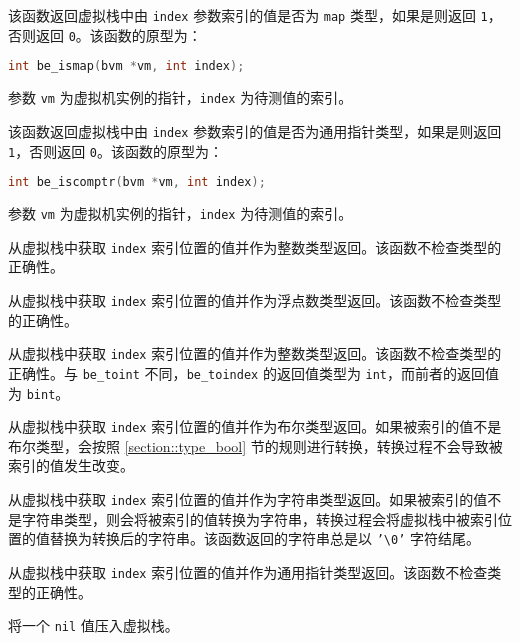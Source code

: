 
该函数返回虚拟栈中由 \texttt{index} 参数索引的值是否为 \texttt{map} 类型，如果是则返回 \texttt{1}，否则返回 \texttt{0}。该函数的原型为：
\begin{lstlisting}[language=c, style=berry, numbers=none]
int be_ismap(bvm *vm, int index);
\end{lstlisting}
参数 \texttt{vm} 为虚拟机实例的指针，\texttt{index} 为待测值的索引。


该函数返回虚拟栈中由 \texttt{index} 参数索引的值是否为通用指针类型，如果是则返回 \texttt{1}，否则返回 \texttt{0}。该函数的原型为：
\begin{lstlisting}[language=c, style=berry, numbers=none]
int be_iscomptr(bvm *vm, int index);
\end{lstlisting}
参数 \texttt{vm} 为虚拟机实例的指针，\texttt{index} 为待测值的索引。


从虚拟栈中获取 \texttt{index} 索引位置的值并作为整数类型返回。该函数不检查类型的正确性。


从虚拟栈中获取 \texttt{index} 索引位置的值并作为浮点数类型返回。该函数不检查类型的正确性。


从虚拟栈中获取 \texttt{index} 索引位置的值并作为整数类型返回。该函数不检查类型的正确性。与 \texttt{be\_toint} 不同，\texttt{be\_toindex} 的返回值类型为 \texttt{int}，而前者的返回值为 \texttt{bint}。


从虚拟栈中获取 \texttt{index} 索引位置的值并作为布尔类型返回。如果被索引的值不是布尔类型，会按照 \ref{section::type_bool} 节的规则进行转换，转换过程不会导致被索引的值发生改变。


从虚拟栈中获取 \texttt{index} 索引位置的值并作为字符串类型返回。如果被索引的值不是字符串类型，则会将被索引的值转换为字符串，转换过程会将虚拟栈中被索引位置的值替换为转换后的字符串。该函数返回的字符串总是以 \texttt{'\textbackslash 0'} 字符结尾。


从虚拟栈中获取 \texttt{index} 索引位置的值并作为通用指针类型返回。该函数不检查类型的正确性。


将一个 \texttt{nil} 值压入虚拟栈。

